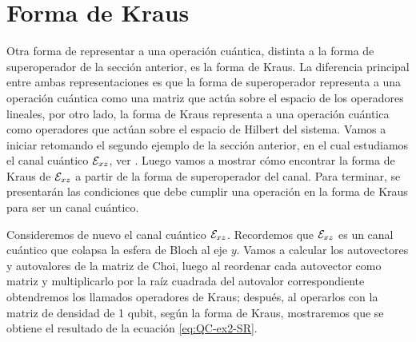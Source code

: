 \section{Forma de Kraus} %

Otra forma de representar a una operación cuántica, distinta a la
forma de superoperador 
 de la sección anterior, es la forma de Kraus. 
La diferencia principal entre ambas representaciones 
es que la forma de superoperador
representa a una operación cuántica como una matriz que 
actúa sobre el espacio de los operadores lineales, por otro lado,
la forma de Kraus representa a una operación cuántica 
como operadores que actúan sobre el espacio de 
Hilbert del sistema. Vamos a iniciar retomando el segundo 
ejemplo de la sección anterior, en el cual estudiamos 
el canal cuántico $\mathcal{E}_{xz}$, ver .
Luego vamos a mostrar cómo encontrar la forma de Kraus de $\mathcal{E}_{xz}$ 
a partir de la forma de superoperador del canal.
Para terminar, se presentarán las condiciones 
que debe cumplir una operación en la forma de Kraus para
ser un canal cuántico.

Consideremos de nuevo el canal cuántico $\mathcal{E}_{xz}$.
Recordemos que $\mathcal{E}_{xz}$ es un canal cuántico
que colapsa la esfera de Bloch al eje $y$. 
Vamos a calcular los autovectores y autovalores de la 
matriz de Choi, luego al reordenar
cada autovector como matriz y multiplicarlo por la raíz cuadrada
del autovalor correspondiente obtendremos los llamados 
operadores de Kraus; después, al operarlos con la matriz 
de densidad de 1 qubit, según 
la forma de Kraus, mostraremos que se obtiene el 
resultado de la ecuación \eqref{eq:QC-ex2-SR}.

